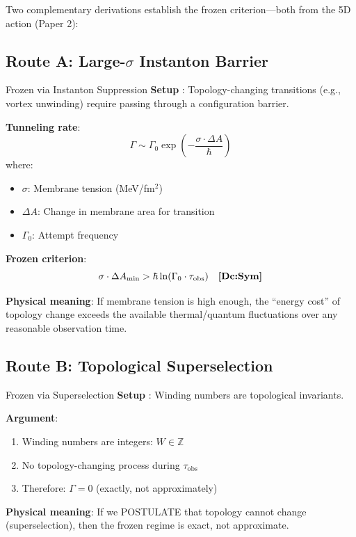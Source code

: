 Two complementary derivations establish the frozen criterion---both
from the 5D action (Paper 2):

\subsection{Route A: Large-$\sigma$ Instanton Barrier}

\begin{mechanism}{Frozen via Instanton Suppression}
\textbf{Setup} \tagDc{}:
Topology-changing transitions (e.g., vortex unwinding) require
passing through a configuration barrier.

\textbf{Tunneling rate}:
\begin{equation}
\Gamma \sim \Gamma_0 \exp\left(-\frac{\sigma \cdot \Delta A}{\hbar}\right)
\end{equation}
where:
\begin{itemize}[nosep]
\item $\sigma$: Membrane tension (MeV/fm$^2$)
\item $\Delta A$: Change in membrane area for transition
\item $\Gamma_0$: Attempt frequency
\end{itemize}

\textbf{Frozen criterion}:
\begin{equation}
\sigma \cdot \Delta A_{\min} > \hbar \ln(\Gamma_0 \cdot \tau_{\text{obs}}) \quad \textbf{[Dc:Sym]}
\end{equation}

\textbf{Physical meaning}: If membrane tension is high enough, the
``energy cost'' of topology change exceeds the available thermal/quantum
fluctuations over any reasonable observation time.
\end{mechanism}

\subsection{Route B: Topological Superselection}

\begin{mechanism}{Frozen via Superselection}
\textbf{Setup} \tagP{}:
Winding numbers are topological invariants.

\textbf{Argument}:
\begin{enumerate}[nosep]
\item[(B1)] Winding numbers are integers: $W \in \mathbb{Z}$ \tagM
\item[(B2)] No topology-changing process during $\tau_{\text{obs}}$ \tagP
\item[(B3)] Therefore: $\Gamma = 0$ (exactly, not approximately) \tagDc
\end{enumerate}

\textbf{Physical meaning}: If we POSTULATE that topology cannot change
(superselection), then the frozen regime is exact, not approximate.
\end{mechanism}

